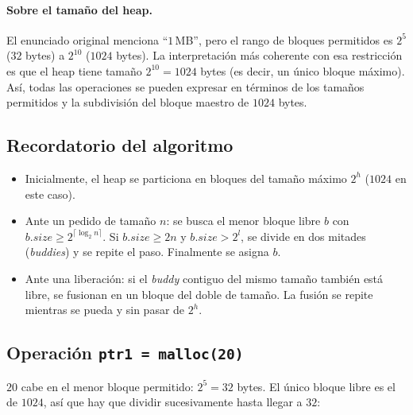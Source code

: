 \documentclass[11pt,a4paper]{article}
\begin{document}
\paragraph{Sobre el tamaño del heap.} El enunciado original menciona
``$1$\,MB'', pero el rango de bloques permitidos es $2^5$ ($32$ bytes)
a $2^{10}$ ($1024$ bytes). La interpretación más coherente con esa
restricción es que el heap tiene tamaño $2^{10} = 1024$ bytes (es decir,
un único bloque máximo). Así, todas las operaciones se pueden expresar
en términos de los tamaños permitidos y la subdivisión del bloque
maestro de $1024$ bytes.

\subsection{Recordatorio del algoritmo}

\begin{itemize}[leftmargin=*]
    \item Inicialmente, el heap se particiona en bloques del tamaño
        máximo $2^h$ ($1024$ en este caso).
    \item Ante un pedido de tamaño $n$: se busca el menor bloque
        libre $b$ con $b.\textit{size} \geq 2^{\lceil \log_2 n \rceil}$.
        Si $b.\textit{size} \geq 2n$ y $b.\textit{size} > 2^l$, se
        divide en dos mitades (\emph{buddies}) y se repite el paso.
        Finalmente se asigna $b$.
    \item Ante una liberación: si el \emph{buddy} contiguo del mismo
        tamaño también está libre, se fusionan en un bloque del doble
        de tamaño. La fusión se repite mientras se pueda y sin pasar
        de $2^h$.
\end{itemize}

\subsection{Operación \texttt{ptr1 = malloc(20)}}

$20$ cabe en el menor bloque permitido: $2^5 = 32$ bytes. El único
bloque libre es el de $1024$, así que hay que dividir sucesivamente
hasta llegar a $32$:
\end{document}
